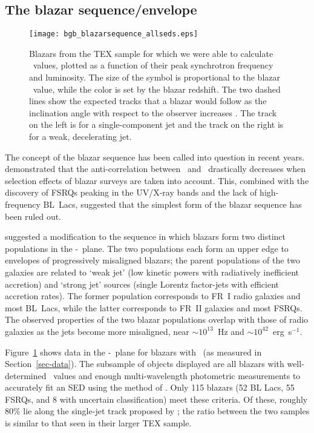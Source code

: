 \documentclass{emulateapj}
\begin{document}
\subsection{The blazar sequence/envelope}\label{ssec-sequence}

\begin{figure}
\texttt{[image: bgb\_blazarsequence\_allseds.eps]}
\caption{Blazars from the \citet{mey11} TEX sample for which we were able to calculate \bgb~values, plotted as a function of their peak synchrotron frequency and luminosity. The size of the symbol is proportional to the blazar \bgb~value, while the color is set by the blazar redshift. The two dashed lines show the expected tracks that a blazar would follow as the inclination angle with respect to the observer increases \citep[Figure~4 in][]{mey11}. The track on the left is for a single-component jet and the track on the right is for a weak, decelerating jet.
\label{fig-blazarsequence}}
\end{figure}

The concept of the blazar sequence has been called into question in recent years. \citet{pad07} demonstrated that the anti-correlation between \lpeak~and \nupeak~drastically decreases when selection effects of blazar surveys are taken into account. This, combined with the discovery of FSRQs peaking in the UV/X-ray bands \citep{pad03,lan08a} and the lack of high-frequency BL~Lacs, suggested that the simplest form of the blazar sequence has been ruled out. 

\citet{mey11} suggested a modification to the sequence in which blazars form two distinct populations in the \nupeak-\lpeak~plane. The two populations each form an upper edge to envelopes of progressively misaligned blazars; the parent populations of the two galaxies are related to `weak jet' (low kinetic powers with radiatively inefficient accretion) and `strong jet' sources (single Lorentz factor-jets with efficient accretion rates). The former population corresponds to FR~I radio galaxies and most BL~Lacs, while the latter corresponds to FR~II galaxies and most FSRQs. The observed properties of the two blazar populations overlap with those of radio galaxies as the jets become more misaligned, near \nupeak$\sim10^{13}$~Hz and \lpeak$\sim10^{42}$~erg~s$^{-1}$. 

Figure~\ref{fig-blazarsequence} shows data in the \nupeak-\lpeak~plane for blazars with \bgb~(as measured in Section~\ref{sec-data}). The subsample of objects displayed are all blazars with well-determined \bgb~values and enough multi-wavelength photometric measurements to accurately fit an SED using the method of \citet{mey11}. Only 115 blazars (52 BL Lacs, 55 FSRQs, and 8 with uncertain classification) meet these criteria. Of these, roughly 80\% lie along the single-jet track proposed by \citet{mey11}; the ratio between the two samples is similar to that seen in their larger TEX sample. 
\end{document}
